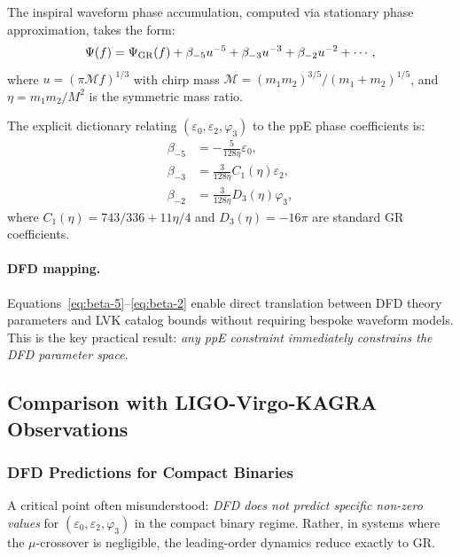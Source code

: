 The inspiral waveform phase accumulation, computed via stationary phase approximation, takes the form:
\begin{equation}\label{eq:ppe-phase}
\Psi(f) = \Psi_{\rm GR}(f) + \beta_{-5}u^{-5} + \beta_{-3}u^{-3} + \beta_{-2}u^{-2} + \cdots,
\end{equation}
where $u = (\pi \mathcal{M} f)^{1/3}$ with chirp mass $\mathcal{M} = (m_1 m_2)^{3/5}/(m_1 + m_2)^{1/5}$, and $\eta = m_1 m_2/M^2$ is the symmetric mass ratio.

The explicit dictionary relating $(\varepsilon_0, \varepsilon_2, \varphi_3)$ to the ppE phase coefficients is:
\begin{align}
\beta_{-5} &= -\frac{5}{128\eta}\varepsilon_0, \label{eq:beta-5}\\
\beta_{-3} &= \frac{3}{128\eta}C_1(\eta)\varepsilon_2, \label{eq:beta-3}\\
\beta_{-2} &= \frac{3}{128\eta}D_3(\eta)\varphi_3, \label{eq:beta-2}
\end{align}
where $C_1(\eta) = 743/336 + 11\eta/4$ and $D_3(\eta) = -16\pi$ are standard GR coefficients.

\paragraph{DFD mapping.}
Equations~\eqref{eq:beta-5}--\eqref{eq:beta-2} enable direct translation between DFD theory parameters and LVK catalog bounds without requiring bespoke waveform models. This is the key practical result: \textit{any ppE constraint immediately constrains the DFD parameter space}.

\subsection{Comparison with LIGO-Virgo-KAGRA Observations}\label{sec:gw-lvk}

\subsubsection{DFD Predictions for Compact Binaries}\label{sec:gw-dfd-pred}

A critical point often misunderstood: \textit{DFD does not predict specific non-zero values} for $(\varepsilon_0, \varepsilon_2, \varphi_3)$ in the compact binary regime. Rather, in systems where the $\mu$-crossover is negligible, the leading-order dynamics reduce exactly to GR.

